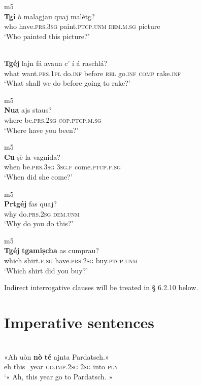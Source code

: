 \ea
\label{}
 {m5}\\
\gll \textbf{Tgi} ò malagjau quaj malètg?\\
who have.\textsc{prs.3sg} paint.\textsc{ptcp.unm} \textsc{dem.m.sg} picture\\
\glt `Who painted this picture?'
\z


\ea
\label{}
 {\citealt[121]{Büchli1966}}\\
\gll \textbf{Tgéj} lajn fá avaun c' í á raschlá?\\
what want.\textsc{prs.1pl} do.\textsc{inf} before \textsc{rel} go.\textsc{inf} \textsc{comp} rake.\textsc{inf}\\
\glt `What shall we do before going to rake?'
\z

\ea
\label{}
 {m5}\\
\gll \textbf{Nua} ajs staus?\\
where be.\textsc{prs.2sg} \textsc{cop.ptcp.m.sg}\\
\glt `Where have you been?'
\z

\ea
\label{}
 {m5}\\
\gll \textbf{Cu} ṣè la vagnida?\\
when be.\textsc{prs.3sg} \textsc{3sg.f} come.\textsc{ptcp.f.sg}\\
\glt `When did she come?'
\z

\ea
\label{}
 {m5}\\
\gll \textbf{Prtgéj} fas quaj?\\
why do.\textsc{prs.2sg} \textsc{dem.unm}\\
\glt `Why do you do this?'
\z

\ea
\label{}
 {m5}\\
\gll \textbf{Tgéj} \textbf{tgamiṣcha} as cumprau?\\
which shirt.\textsc{f.sg} have.\textsc{prs.2sg} buy.\textsc{ptcp.unm}\\
\glt `Which shirt did you buy?'
\z



Indirect interrogative clauses will be treated in § 6.2.10 below.


\section{Imperative sentences}

\ea
\label{}
\\
	\gll  «Ah uòn \textbf{nò} \textbf{té} ajnta Pardatsch.»\\
eh this\_year \textsc{go.imp.2sg} \textsc{2sg} into \textsc{pln}\\
\glt `« Ah, this year go to Pardatsch. »
\z


